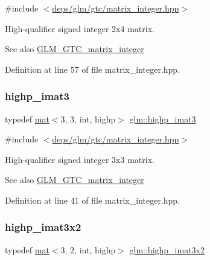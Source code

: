 {\ttfamily \#include $<$\hyperlink{matrix__integer_8hpp}{deps/glm/gtc/matrix\+\_\+integer.\+hpp}$>$}

High-\/qualifier signed integer 2x4 matrix. \begin{DoxySeeAlso}{See also}
\hyperlink{group__gtc__matrix__integer}{G\+L\+M\+\_\+\+G\+T\+C\+\_\+matrix\+\_\+integer} 
\end{DoxySeeAlso}


Definition at line 57 of file matrix\+\_\+integer.\+hpp.

\mbox{\label{group__gtc__matrix__integer_ga3a8088cb8c764ec1c3719f31b3687ba8}} 
\subsubsection{\texorpdfstring{highp\+\_\+imat3}{highp\_imat3}}
{\footnotesize\ttfamily typedef \hyperlink{structglm_1_1mat}{mat}$<$3, 3, int, highp$>$ \hyperlink{group__gtc__matrix__integer_ga3a8088cb8c764ec1c3719f31b3687ba8}{glm\+::highp\+\_\+imat3}}



{\ttfamily \#include $<$\hyperlink{matrix__integer_8hpp}{deps/glm/gtc/matrix\+\_\+integer.\+hpp}$>$}

High-\/qualifier signed integer 3x3 matrix. \begin{DoxySeeAlso}{See also}
\hyperlink{group__gtc__matrix__integer}{G\+L\+M\+\_\+\+G\+T\+C\+\_\+matrix\+\_\+integer} 
\end{DoxySeeAlso}


Definition at line 41 of file matrix\+\_\+integer.\+hpp.

\mbox{\label{group__gtc__matrix__integer_gaf5097ad25b9a991ad010aba6736b333e}} 
\subsubsection{\texorpdfstring{highp\+\_\+imat3x2}{highp\_imat3x2}}
{\footnotesize\ttfamily typedef \hyperlink{structglm_1_1mat}{mat}$<$3, 2, int, highp$>$ \hyperlink{group__gtc__matrix__integer_gaf5097ad25b9a991ad010aba6736b333e}{glm\+::highp\+\_\+imat3x2}}



